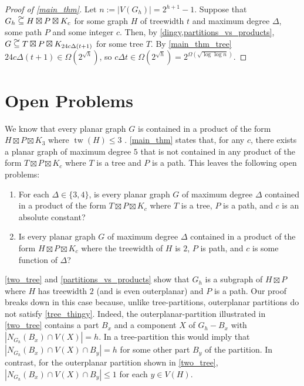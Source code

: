 \documentclass{patmorin}
\DeclareMathOperator{\tw}{tw}
\newcommand\subsetcong{\mathrel{\text{%
    \setbox0\hbox{$\subseteq$}%
    \rlap{\hbox to \wd0{\hss\hss\hss\raisebox{1.5\height}{$\sim$}\hss}}\box0
}}}
\renewcommand{\le}{\leqslant}
\begin{document}
\begin{proof}[Proof of \cref{main_thm}]
  Let $n:=|V(G_h)|=2^{h+1}-1$.  Suppose that $G_h\subsetcong H\boxtimes P\boxtimes K_c$ for some graph $H$ of treewidth $t$ and maximum degree $\Delta$, some path $P$ and some integer $c$.  Then, by \cref{dingy,partitions_vs_products}, $G\subsetcong T\boxtimes P\boxtimes K_{24 c \Delta (t+1)}$ for some tree $T$.  By \cref{main_thm_tree} $24 c \Delta (t+1) \in \Omega(2^{\sqrt{h}})$, so $c\Delta t \in \Omega(2^{\sqrt{h}}) = 2^{\Omega(\sqrt{\log\log n})}$.
\end{proof}



\section{Open Problems}

We know that every planar graph $G$ is contained in a product of the form $H\boxtimes P\boxtimes K_3$ where $\tw(H)\le 3$ \cite{dujmovic.joret.ea:planar}. \cref{main_thm} states that, for any $c$, there exists a planar graph of maximum degree $5$ that is not contained in any product of the form $T\boxtimes P\boxtimes K_c$ where $T$ is a tree and $P$ is a path.  This leaves the following open problems:

\begin{enumerate}
  \item For each $\Delta\in\{3,4\}$, is every planar graph $G$ of maximum degree $\Delta$ contained in a product of the form $T\boxtimes P\boxtimes K_c$ where $T$ is a tree, $P$ is a path, and $c$ is an absolute constant?

  \item Is every planar graph $G$ of maximum degree $\Delta$ contained in a product of the form $H\boxtimes P\boxtimes K_c$ where the treewidth of $H$ is $2$, $P$ is path, and $c$ is some function of $\Delta$?
\end{enumerate}

\cref{two_tree} and \cref{partitions_vs_products} show that $G_h$ is a subgraph of $H\boxtimes P$ where $H$ has treewidth $2$ (and is even outerplanar) and $P$ is a path. Our proof breaks down in this case because, unlike tree-partitions, outerplanar partitions do not satisfy \cref{tree_thingy}.  Indeed, the outerplanar-partition illustrated in \cref{two_tree} contains a part $B_x$ and a component $X$ of $G_h-B_x$ with $|N_{G_h}(B_x)\cap V(X)|=h$.  In a tree-partition this would imply that $|N_{G_h}(B_x)\cap V(X)\cap B_y|=h$ for some other part $B_y$ of the partition.  In contrast, for the outerplanar partition shown in \cref{two_tree}, $|N_{G_h}(B_x)\cap V(X)\cap B_y|\le 1$ for each $y\in V(H)$.
\end{document}
